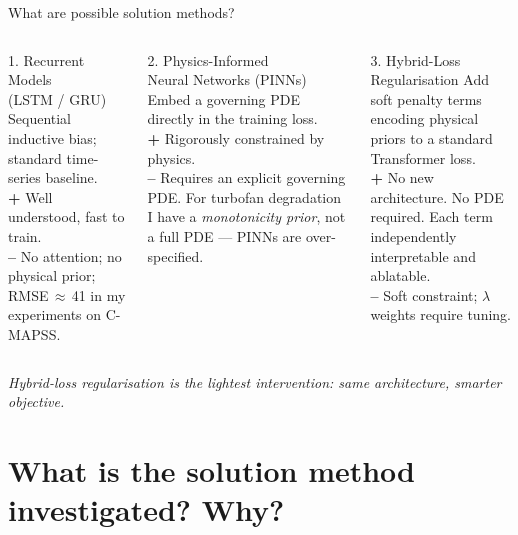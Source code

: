 \documentclass[10pt, aspectratio=169, handout]{beamer}
\begin{document}
\begin{frame}{What are possible solution methods?}
  \begin{columns}[T]
      \begin{block}{1. Recurrent Models\\(LSTM / GRU)}
        \small
        Sequential inductive bias; standard time-series baseline.\\[4pt]
        \textbf{+ }Well understood, fast to train.\\[2pt]
        \textbf{-- }No attention; no physical prior; RMSE\,$\approx$\,41 in my experiments on C-MAPSS.
      \end{block}

      \begin{block}{2. Physics-Informed\\Neural Networks (PINNs)}
        \small
        Embed a governing PDE directly in the training loss.\\[4pt]
        \textbf{+ }Rigorously constrained by physics.\\[2pt]
        \textbf{-- }Requires an explicit governing PDE.  For turbofan degradation I have a \emph{monotonicity prior}, not a full PDE --- PINNs are over-specified.
      \end{block}

      \begin{block}{3. Hybrid-Loss\\Regularisation \textcolor{Teal}{}}
        \small
        Add soft penalty terms encoding physical priors to a standard Transformer loss.\\[4pt]
        \textbf{+ }No new architecture.  No PDE required.  Each term independently interpretable and ablatable.\\[2pt]
        \textbf{-- }Soft constraint; $\lambda$ weights require tuning.
      \end{block}
  \end{columns}
  \vspace{10pt}
  {\small\textit{Hybrid-loss regularisation is the lightest intervention: same architecture, smarter objective.}}
\end{frame}

\section{What is the solution method investigated? Why?}
\end{document}
